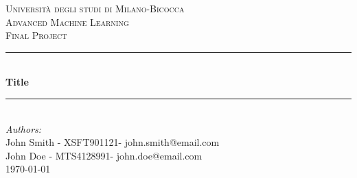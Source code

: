 \begin{titlepage}

\newcommand{\HRule}{\rule{\linewidth}{0.5mm}} %

\center %
 

\textsc{\LARGE Università degli studi di Milano-Bicocca}\\[1cm] %
\textsc{\Large Advanced Machine Learning }\\[0.3cm] %
\textsc{\large Final Project}\\[0.1cm] %


\HRule \\[0.4cm]
{ \huge \bfseries Title}\\[0.4cm] %
\HRule \\[1.5cm]
 

\large
\emph{Authors:}\\
John Smith - XSFT901121- john.smith@email.com \\   %
John Doe - MTS4128991- john.doe@email.com   \\[1cm] %



{\large \today}\\[2cm] %


\end{titlepage}
